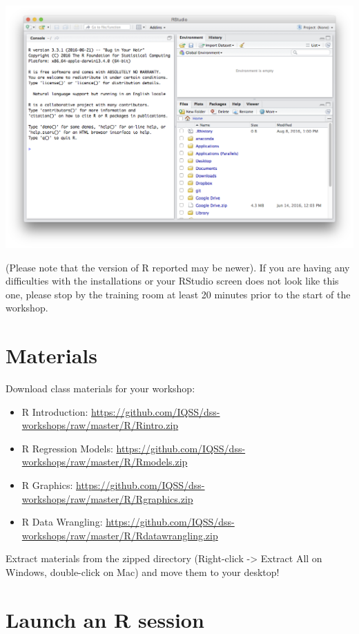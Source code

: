 \documentclass[]{book}
\providecommand{\tightlist}{%
  \setlength{\itemsep}{0pt}\setlength{\parskip}{0pt}}
\begin{document}
\includegraphics{R/Rinstall/images/rstudio_successful_install.png}

(Please note that the version of R reported may be newer). If you are having any difficulties with the installations or your RStudio screen does not look like this one, please stop by the training room at least 20 minutes prior to the start of the workshop.

\hypertarget{materials}{%
\section{Materials}\label{materials}}

Download class materials for your workshop:

\begin{itemize}
\tightlist
\item
  R Introduction: \url{https://github.com/IQSS/dss-workshops/raw/master/R/Rintro.zip}
\item
  R Regression Models: \url{https://github.com/IQSS/dss-workshops/raw/master/R/Rmodels.zip}
\item
  R Graphics: \url{https://github.com/IQSS/dss-workshops/raw/master/R/Rgraphics.zip}
\item
  R Data Wrangling: \url{https://github.com/IQSS/dss-workshops/raw/master/R/Rdatawrangling.zip}
\end{itemize}

Extract materials from the zipped directory (Right-click -\textgreater{} Extract All on Windows, double-click on Mac) and move them to your desktop!

\hypertarget{launch-an-r-session}{%
\section{Launch an R session}\label{launch-an-r-session}}
\end{document}
